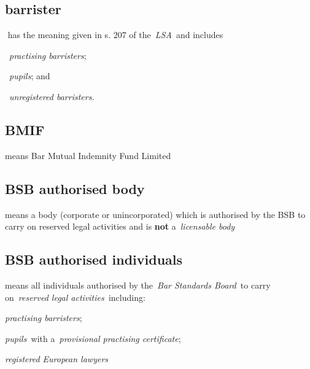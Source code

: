    \subsection{barrister } has the meaning given in s. 207 of
  the~\emph{LSA~}and includes \al \item ~\emph{practising
  barristers}; \item ~\emph{pupils}; and \item ~\emph{unregistered
  barristers.} \la \subsection{BMIF } means Bar Mutual Indemnity Fund Limited  \subsection{BSB authorised body }means a body (corporate or
  unincorporated) which is authorised by the BSB to carry on reserved
  legal activities and is \textbf{not} a~\emph{licensable body} \subsection{BSB authorised individuals } means all individuals authorised
  by the~\emph{Bar Standards Board~}to carry on~\emph{reserved legal
  activities~}including:
  \al \item \emph{practising
  barristers};
  \item \emph{pupils~}with a~\emph{provisional practising
  certificate};
  \item \emph{registered European lawyers}\la
